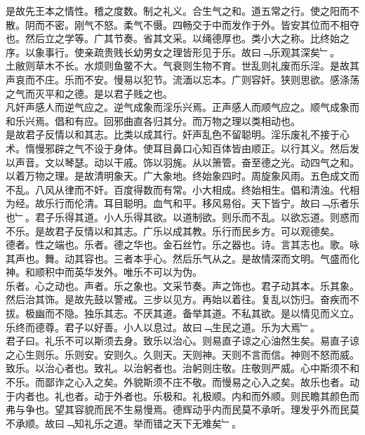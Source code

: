 \documentclass{zhvt-classic}
\begin{document}
\hspace*{2em}是故先王本之情性。稽之度数。制之礼义。合生气之和。道五常之行。使之阳而不散。阴而不密。刚气不怒。柔气不慑。四畅交于中而发作于外。皆安其位而不相夺也。然后立之学等。广其节奏。省其文采。以绳德厚也。类小大之称。比终始之序。以象事行。使亲疏贵贱长幼男女之理皆形见于乐。故曰﹁乐观其深矣﹂。\\
\hspace*{2em}土敝则草木不长。水烦则鱼鳖不大。气衰则生物不育。世乱则礼废而乐淫。是故其声哀而不庄。乐而不安。慢易以犯节。流湎以忘本。广则容奸。狭则思欲。感涤荡之气而灭平和之德。是以君子贱之也。\\
\hspace*{2em}凡奸声感人而逆气应之。逆气成象而淫乐兴焉。正声感人而顺气应之。顺气成象而和乐兴焉。倡和有应。回邪曲直各归其分。而万物之理以类相动也。\\
\hspace*{2em}是故君子反情以和其志。比类以成其行。奸声乱色不留聪明。淫乐废礼不接于心术。惰慢邪辟之气不设于身体。使耳目鼻口心知百体皆由顺正。以行其义。然后发以声音。文以琴瑟。动以干戚。饰以羽旄。从以箫管。奋至德之光。动四气之和。以着万物之理。是故清明象天。广大象地。终始象四时。周旋象风雨。五色成文而不乱。八风从律而不奸。百度得数而有常。小大相成。终始相生。倡和清浊。代相为经。故乐行而伦清。耳目聪明。血气和平。移风易俗。天下皆宁。故曰﹁乐者乐也﹂。君子乐得其道。小人乐得其欲。以道制欲。则乐而不乱。以欲忘道。则惑而不乐。是故君子反情以和其志。广乐以成其教。乐行而民乡方。可以观德矣。\\
\hspace*{2em}德者。性之端也。乐者。德之华也。金石丝竹。乐之器也。诗。言其志也。歌。咏其声也。舞。动其容也。三者本乎心。然后乐气从之。是故情深而文明。气盛而化神。和顺积中而英华发外。唯乐不可以为伪。\\
\hspace*{2em}乐者。心之动也。声者。乐之象也。文采节奏。声之饰也。君子动其本。乐其象。然后治其饰。是故先鼓以警戒。三步以见方。再始以着往。复乱以饬归。奋疾而不拔。极幽而不隐。独乐其志。不厌其道。备举其道。不私其欲。是以情见而义立。乐终而德尊。君子以好善。小人以息过。故曰﹁生民之道。乐为大焉﹂。\\
\hspace*{2em}君子曰。礼乐不可以斯须去身。致乐以治心。则易直子谅之心油然生矣。易直子谅之心生则乐。乐则安。安则久。久则天。天则神。天则不言而信。神则不怒而威。致乐。以治心者也。致礼。以治躬者也。治躬则庄敬。庄敬则严威。心中斯须不和不乐。而鄙诈之心入之矣。外貌斯须不庄不敬。而慢易之心入之矣。故乐也者。动于内者也。礼也者。动于外者也。乐极和。礼极顺。内和而外顺。则民瞻其颜色而弗与争也。望其容貌而民不生易慢焉。德辉动乎内而民莫不承听。理发乎外而民莫不承顺。故曰﹁知礼乐之道。举而错之天下无难矣﹂。\\
\end{document}
